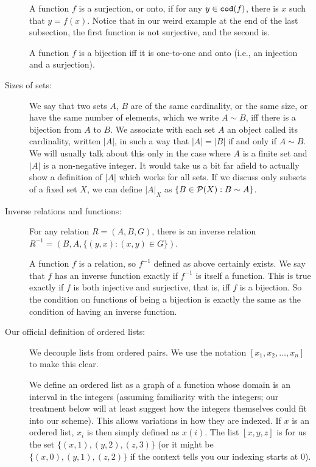 \documentclass[12pt]{article}
\begin{document}
\begin{description}
A function $f$ is a surjection, or onto, if for any $y \in {\tt cod}(f)$, there is $x$ such that $y = f(x)$.  Notice that in our weird example at the end of the last subsection, the first function is not surjective, and the second is.

A function $f$ is a bijection iff it is one-to-one and onto (i.e., an injection and a surjection).

\item[Sizes of sets:]  We say that two sets $A$, $B$ are of the same cardinality, or the same size, or have the same number of elements, which we write $A \sim B$, iff there is a bijection from $A$ to $B$.  We associate with each set $A$ an object called its cardinality, written $|A|$, in such a way that $|A| = |B|$ if and only if $A \sim B$.  We will usually talk about this only in the case where $A$ is a finite set
and $|A|$ is a non-negative integer.  It would take us a bit far afield to actually show a definition of $|A|$ which works for all sets.  If we discuss only subsets of a fixed set $X$, we can define $|A|_X$ as
$\{B \in {\cal P}(X):B \sim A\}$.

\item[Inverse relations and functions:]

For any relation $R=(A,B,G)$, there is an inverse relation $R^{-1} = (B,A,\{(y,x):(x,y)\in G\})$.

A function $f$ is a relation, so $f^{-1}$ defined as above certainly exists.  We say that $f$ has an inverse function exactly if $f^{-1}$ is itself a function.  This is true exactly if $f$ is both injective and surjective, that is, iff $f$ is a bijection.  So the condition on functions of being a bijection is exactly the same as the condition of having an inverse function.

\item[Our official definition of ordered lists:]  We decouple lists from ordered pairs.  We use the notation
$[x_1,x_2,\ldots,x_n]$ to make this clear.

We define an ordered list as a graph of a function whose domain is an interval in the integers (assuming familiarity with the integers;  our treatment below will at least suggest how the integers themselves could fit into our scheme).  This allows variations in how
they are indexed.  If $x$ is an ordered list, $x_i$ is then simply defined as $x(i)$.  The list $[x,y,z]$ is for us
the set $\{(x,1),(y,2),(z,3)\}$ (or it might be $\{(x,0),(y,1),(z,2)\}$ if the context tells you our indexing starts at 0).


\end{description}
\end{document}

